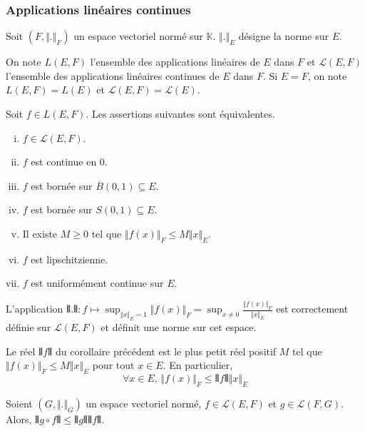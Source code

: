 	\subsubsection{Applications linéaires continues}

	Soit $(F, \Vert . \Vert_F)$ un espace vectoriel normé sur $\mathbb{K}$. $\Vert . \Vert_E$ désigne la norme sur $E$.

	\begin{notation}
		On note $L(E,F)$ l'ensemble des applications linéaires de $E$ dans $F$ et $\mathcal{L}(E,F)$ l'ensemble des applications linéaires continues de $E$ dans $F$. Si $E = F$, on note $L(E,F) = L(E)$ et $\mathcal{L}(E,F) = \mathcal{L}(E)$.
	\end{notation}

	\begin{theorem}
		Soit $f \in L(E,F)$. Les assertions suivantes sont équivalentes.
		\begin{enumerate}[(i)]
			\item $f \in \mathcal{L}(E,F)$.
			\item $f$ est continue en $0$.
			\item $f$ est bornée sur $\overline{B}(0,1) \subseteq E$.
			\item $f$ est bornée sur $S(0,1) \subseteq E$.
			\item Il existe $M \geq 0$ tel que $\Vert f(x) \Vert_F \leq M \Vert x \Vert_E$.
			\item $f$ est lipschitzienne.
			\item $f$ est uniformément continue sur $E$.
		\end{enumerate}
	\end{theorem}

	\begin{corollary}
		L'application $\VERT . \VERT : f \mapsto \sup_{\Vert x \Vert_E = 1} \Vert f(x) \Vert_F = \sup_{x \neq 0} \frac{\Vert f(x) \Vert_F}{\Vert x \Vert_E}$ est correctement définie sur $\mathcal{L}(E,F)$ et définit une norme sur cet espace.
	\end{corollary}

	\begin{remark}
		Le réel $\VERT f \VERT$ du corollaire précédent est le plus petit réel positif $M$ tel que $\Vert f(x) \Vert_F \leq M \Vert x \Vert_E$ pour tout $x \in E$. En particulier,
		\[ \forall x \in E, \, \Vert f(x) \Vert_F \leq \VERT f \VERT \Vert x \Vert_E \]
	\end{remark}

	\begin{proposition}
		Soient $(G, \Vert . \Vert_G)$ un espace vectoriel normé, $f \in \mathcal{L}(E,F)$ et $g \in \mathcal{L}(F,G)$. Alors, $\VERT g \circ f \VERT \leq \VERT g \VERT \VERT f \VERT$.
	\end{proposition}


